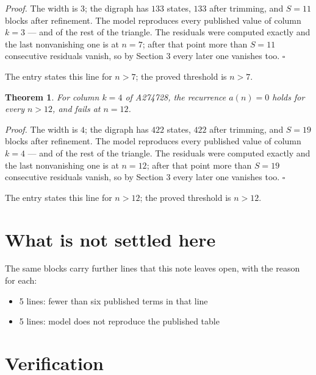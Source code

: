 \documentclass[11pt]{article}
\newtheorem{theorem}{Theorem}
\theoremstyle{definition}
\begin{document}
{\itshape Proof.} The width is $3$; the digraph has $133$ states, $133$ after trimming, and $S = 11$ blocks after refinement. The model reproduces every published value of column $k = 3$ --- and of the rest of the triangle. The residuals were computed exactly and the last nonvanishing one is at $n = 7$; after that point more than $S = 11$ consecutive residuals vanish, so by Section 3 every later one vanishes too. $\square$

The entry states this line for $n > 7$; the proved threshold is $n > 7$.

\begin{theorem} For column $k = 4$ of A274728, the recurrence $a(n) = 0$ holds for every $n > 12$, and fails at $n = 12$.\end{theorem}

{\itshape Proof.} The width is $4$; the digraph has $422$ states, $422$ after trimming, and $S = 19$ blocks after refinement. The model reproduces every published value of column $k = 4$ --- and of the rest of the triangle. The residuals were computed exactly and the last nonvanishing one is at $n = 12$; after that point more than $S = 19$ consecutive residuals vanish, so by Section 3 every later one vanishes too. $\square$

The entry states this line for $n > 12$; the proved threshold is $n > 12$.

\section{What is not settled here}

The same blocks carry further lines that this note leaves open, with the reason for each:

\begin{itemize}

\item 5 lines: fewer than six published terms in that line

\item 5 lines: model does not reproduce the published table

\end{itemize}

\section{Verification}
\end{document}
